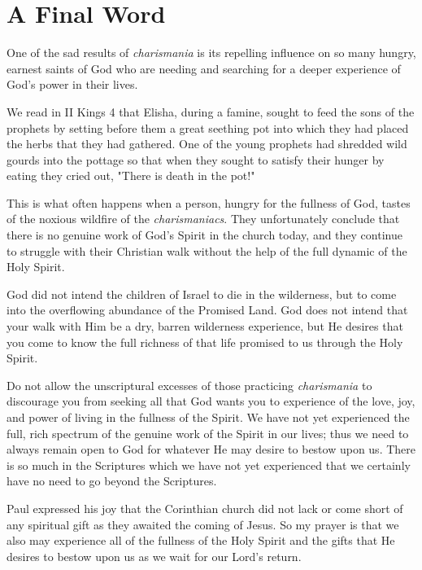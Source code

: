 \chapter{A Final Word}

One of the sad results of \emph{charismania} is its repelling influence on so many hungry, earnest saints of God who are needing and searching for a deeper experience of God's power in their lives. 

We read in II Kings 4 that Elisha, during a famine, sought to feed the sons of the prophets by setting before them a great seething pot into which they had placed the herbs that they had gathered. One of the young prophets had shredded wild gourds into the pottage so that when they sought to satisfy their hunger by eating they cried out, "There is death in the pot!" 

This is what often happens when a person, hungry for the fullness of God, tastes of the noxious wildfire of the \emph{charismaniacs}. They unfortunately conclude that there is no genuine work of God's Spirit in the church today, and they continue to struggle with their Christian walk without the help of the full dynamic of the Holy Spirit. 

God did not intend the children of Israel to die in the wilderness, but to come into the overflowing abundance of the Promised Land. God does not intend that your walk with Him be a dry, barren wilderness experience, but He desires that you come to know the full richness of that life promised to us through the Holy Spirit. 

Do not allow the unscriptural excesses of those practicing \emph{charismania} to discourage you from seeking all that God wants you to experience of the love, joy, and power of living in the fullness of the Spirit. We have not yet experienced the full, rich spectrum of the genuine work of the Spirit in our lives; thus we need to always remain open to God for whatever He may desire to bestow upon us. There is so much in the Scriptures which we have not yet experienced that we certainly have no need to go beyond the Scriptures. 

Paul expressed his joy that the Corinthian church did not lack or come short of any spiritual gift as they awaited the coming of Jesus. So my prayer is that we also may experience all of the fullness of the Holy Spirit and the gifts that He desires to bestow upon us as we wait for our Lord's return. 


